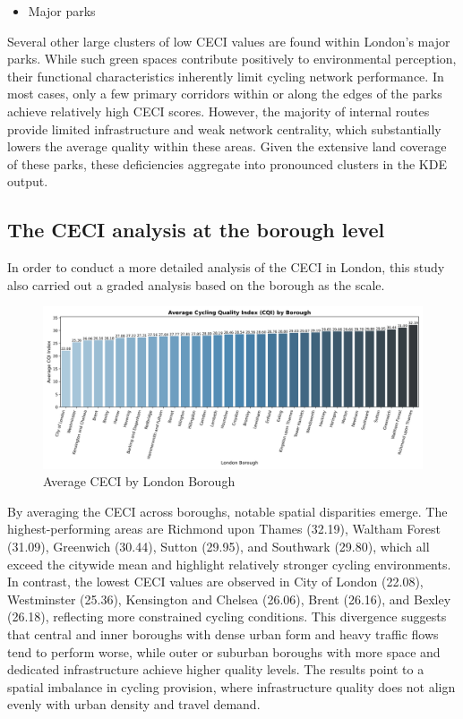 \documentclass[
  12pt,
  oneside]{book}
\providecommand{\tightlist}{%
  \setlength{\itemsep}{0pt}\setlength{\parskip}{0pt}}
\begin{document}
\begin{itemize}
\tightlist
\item
  Major parks
\end{itemize}

Several other large clusters of low CECI values are found within London's major parks. While such green spaces contribute positively to environmental perception, their functional characteristics inherently limit cycling network performance. In most cases, only a few primary corridors within or along the edges of the parks achieve relatively high CECI scores. However, the majority of internal routes provide limited infrastructure and weak network centrality, which substantially lowers the average quality within these areas. Given the extensive land coverage of these parks, these deficiencies aggregate into pronounced clusters in the KDE output.

\subsection{The CECI analysis at the borough level}\label{the-ceci-analysis-at-the-borough-level}

In order to conduct a more detailed analysis of the CECI in London, this study also carried out a graded analysis based on the borough as the scale.

\begin{figure}

{\centering \includegraphics[width=1\linewidth]{general_images/AverageCQIbyBorough} 

}

\caption{Average CECI by London Borough}\label{fig:AverageCQIbyBorough}
\end{figure}

By averaging the CECI across boroughs, notable spatial disparities emerge. The highest-performing areas are Richmond upon Thames (32.19), Waltham Forest (31.09), Greenwich (30.44), Sutton (29.95), and Southwark (29.80), which all exceed the citywide mean and highlight relatively stronger cycling environments. In contrast, the lowest CECI values are observed in City of London (22.08), Westminster (25.36), Kensington and Chelsea (26.06), Brent (26.16), and Bexley (26.18), reflecting more constrained cycling conditions. This divergence suggests that central and inner boroughs with dense urban form and heavy traffic flows tend to perform worse, while outer or suburban boroughs with more space and dedicated infrastructure achieve higher quality levels. The results point to a spatial imbalance in cycling provision, where infrastructure quality does not align evenly with urban density and travel demand.
\end{document}
